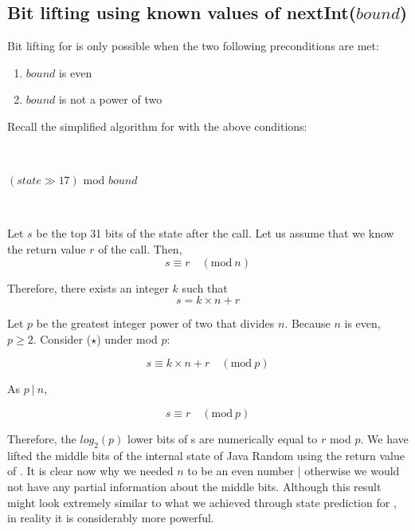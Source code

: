 \documentclass{article}
\begin{document}
\subsection{ Bit lifting using known values of nextInt($bound$) }

Bit lifting for  is only possible when the two following preconditions are met:
\begin{enumerate}
    \item $bound$ is even
    \item $bound$ is not a power of two
\end{enumerate}

\noindent Recall the simplified algorithm for  with the above conditions:

\
\begin{algorithmic}
    \State \Return $(state \gg 17)$ mod $bound$
\EndFunction
\end{algorithmic}
\ \

Let $s$ be the top 31 bits of the state after the  call. Let us assume that we know the return value $r$ of the  call. Then,
\begin{equation}
    s \equiv r \quad (\text{mod} \ n)
\end{equation}

\noindent Therefore, there exists an integer $k$ such that
\begin{equation}\tag{$\star$}
     s = k \times n + r
\end{equation}

\noindent Let $p$ be the greatest integer power of two that divides $n$. Because $n$ is even, $p \ge 2$. Consider ($\star$) under mod $p$:

\begin{equation}
     s \equiv k \times n + r \quad (\text{mod} \ p)
\end{equation}

\noindent As $p \ | \ n$,

\begin{equation}\label{lifting.core}\tag{$\star\star$}
     s \equiv r \quad (\text{mod} \ p)
\end{equation}

Therefore, the $log_2(p)$ lower bits of s are numerically equal to $r$ mod $p$. We have lifted the middle bits of the internal state of Java Random using the return value of . It is clear now why we needed $n$ to be an even number | otherwise we would not have any partial information about the middle bits.
Although this result might look extremely similar to what we achieved through state prediction for \Call{nextInt}{$2^n$}, in reality it is considerably more powerful.
\end{document}
